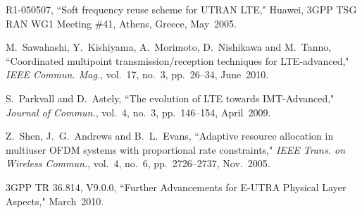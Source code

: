 \documentclass[conference]{IEEEtran}
\begin{document}
\begin{thebibliography}{1}
R1-050507, ``Soft frequency reuse scheme for UTRAN LTE," Huawei, 3GPP TSG RAN WG1 Meeting \#41, Athens, Greece, May~2005.

M.~Sawahashi, Y.~Kishiyama, A.~Morimoto, D.~Nishikawa and M.~Tanno, ``Coordinated multipoint transmission/reception techniques for LTE-advanced," \emph{IEEE Commun. Mag.}, vol.~17, no.~3, pp.~26--34, June~2010.

S.~Parkvall and D.~Astely, ``The evolution of LTE towards IMT-Advanced," \emph{Journal of Commun.}, vol.~4, no.~3, pp.~146--154, April~2009.

Z.~Shen, J.~G.~Andrews and B.~L.~Evans, ``Adaptive resource allocation in multiuser OFDM systems with proportional rate constraints," \emph{IEEE Trans. on Wireless Commun.}, vol.~4, no.~6, pp.~2726--2737, Nov.~2005.


3GPP TR 36.814, V9.0.0, ``Further Advancements for E-UTRA Physical Layer Aspects," March~2010.


\end{thebibliography}
\end{document}
